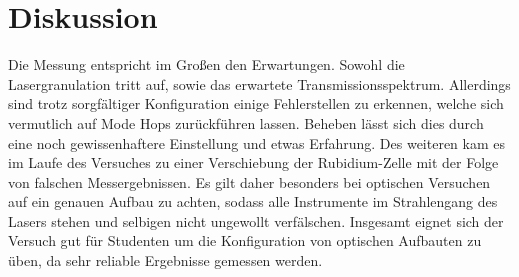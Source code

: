 \section{Diskussion}
\label{sec:Diskussion}
Die Messung entspricht im Großen den Erwartungen.
Sowohl die Lasergranulation tritt auf,
sowie das erwartete Transmissionsspektrum.
Allerdings sind trotz sorgfältiger Konfiguration einige Fehlerstellen zu erkennen,
welche sich vermutlich auf Mode Hops zurückführen lassen.
Beheben lässt sich dies durch eine noch gewissenhaftere Einstellung und etwas Erfahrung.
Des weiteren kam es im Laufe des Versuches zu einer Verschiebung der Rubidium-Zelle
mit der Folge von falschen Messergebnissen.
Es gilt daher besonders bei optischen Versuchen auf ein genauen Aufbau zu achten,
sodass alle Instrumente im Strahlengang des Lasers stehen und selbigen nicht ungewollt verfälschen.
Insgesamt eignet sich der Versuch gut für Studenten um die Konfiguration von optischen Aufbauten zu üben,
da sehr reliable Ergebnisse gemessen werden.